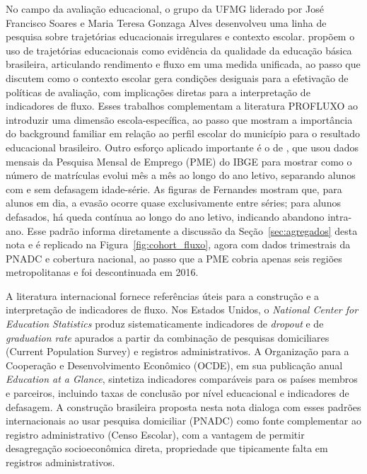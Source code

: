 No campo da avaliação educacional, o grupo da UFMG liderado por
José Francisco Soares e Maria Teresa Gonzaga Alves desenvolveu uma
linha de pesquisa sobre trajetórias educacionais irregulares e
contexto escolar. \citet{SoaresAlvesFonseca2021_trajetorias} propõem
o uso de trajetórias educacionais como evidência da qualidade da
educação básica brasileira, articulando rendimento e fluxo em uma
medida unificada, ao passo que \citet{AlvesSoares2013_contexto}
discutem como o contexto escolar gera condições desiguais para a
efetivação de políticas de avaliação, com implicações diretas para
a interpretação de indicadores de fluxo. Esses trabalhos
complementam a literatura PROFLUXO ao introduzir uma dimensão
escola-específica, ao passo que \citet{RianiRiosNeto2008_background}
mostram a importância do background familiar em relação ao perfil
escolar do município para o resultado educacional brasileiro. Outro
esforço aplicado importante é o de \citet{Fernandes2011_atratividade},
que usou dados mensais da Pesquisa Mensal de Emprego (PME) do IBGE
para mostrar como o número de matrículas evolui mês a mês ao longo
do ano letivo, separando alunos com e sem defasagem idade-série. As
figuras de Fernandes mostram que, para alunos em dia, a evasão
ocorre quase exclusivamente entre séries; para alunos defasados, há
queda contínua ao longo do ano letivo, indicando abandono intra-ano.
Esse padrão informa diretamente a discussão da
Seção~\ref{sec:agregados} desta nota e é replicado na
Figura~\ref{fig:cohort_fluxo}, agora com dados trimestrais da PNADC
e cobertura nacional, ao passo que a PME cobria apenas seis regiões
metropolitanas e foi descontinuada em 2016.

A literatura internacional fornece referências úteis para a
construção e a interpretação de indicadores de fluxo. Nos Estados
Unidos, o \emph{National Center for Education Statistics} produz
sistematicamente indicadores de \emph{dropout} e de
\emph{graduation rate} apurados a partir da combinação de pesquisas
domiciliares (Current Population Survey) e registros
administrativos. A Organização para a Cooperação e Desenvolvimento
Econômico (OCDE), em sua publicação anual \emph{Education at a
Glance}, sintetiza indicadores comparáveis para os países membros
e parceiros, incluindo taxas de conclusão por nível educacional e
indicadores de defasagem. A construção brasileira proposta nesta
nota dialoga com esses padrões internacionais ao usar pesquisa
domiciliar (PNADC) como fonte complementar ao registro
administrativo (Censo Escolar), com a vantagem de permitir
desagregação socioeconômica direta, propriedade que tipicamente
falta em registros administrativos.

